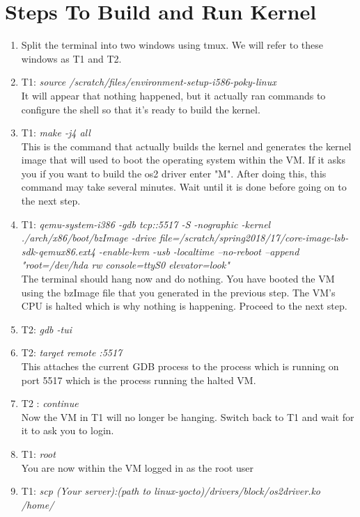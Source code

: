 \documentclass[onecolumn,draftclsnofoot, 10pt, compsoc]{IEEEtran}
\begin{document}
	\section{Steps To Build and Run Kernel}
	\begin{enumerate}
		\item
		Split the terminal into two windows using tmux.
		We will refer to these windows as T1 and T2. 
		\item
		T1: \textit{source /scratch/files/environment-setup-i586-poky-linux} \\
		It will appear that nothing happened, but it actually ran commands to configure the shell so that it’s ready to build the kernel. 
		\item
		T1: \textit{make -j4 all} \\
		This is the command that actually builds the kernel and generates the kernel image that will used to boot the operating system within the VM. 
		If it asks you if you want to build the os2 driver enter "M".
		After doing this, this command may take several minutes. 
		Wait until it is done before going on to the next step.
		\item
		T1: 
		\textit{qemu-system-i386 -gdb tcp::5517 -S -nographic -kernel ./arch/x86/boot/bzImage -drive file=/scratch/spring2018/17/core-image-lsb-sdk-qemux86.ext4 -enable-kvm -usb -localtime --no-reboot --append "root=/dev/hda rw console=ttyS0 elevator=look"} \\
		The terminal should hang now and do nothing. 
		You have booted the VM using the bzImage file that you generated in the previous step. 
		The VM’s CPU is halted which is why nothing is happening. 
		Proceed to the next step.	
		\item
		T2: \textit{gdb -tui}
		\item
		T2: \textit{target remote :5517} \\
		This attaches the current GDB process to the process which is running on port 5517 which is the process running the halted VM.
		\item
		T2 : \textit{continue} \\
		Now the VM in T1 will no longer be hanging. 
		Switch back to T1 and wait for it to ask you to login.
		\item
		T1: \textit{root} \\
		You are now within the VM logged in as the root user
		\item
		T1: \textit{scp (Your server):(path to linux-yocto)/drivers/block/os2driver.ko /home/ } \\

\end{enumerate}
\end{document}
